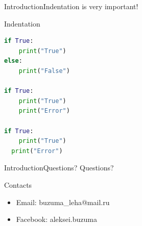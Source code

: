 \documentclass[10pt]{beamer}
\begin{document}
\begin{frame}[fragile]{Introduction}{Indentation is very important!}
	
\begin{block}{Indentation}
	
\begin{lstlisting}[language=Python, tabsize=4, showspaces=true, showtabs=true]
if True:
    print("True")
else:
    print("False")

if True:
	print("True")
    print("Error")

if True:
    print("True")
  print("Error")
\end{lstlisting}

\end{block}	
	
\end{frame}


\begin{frame}{Introduction}{Questions?}
	\large Questions?
	\begin{center}
		
		\begin{block}{Contacts}
			\begin{itemize}
				\item Email:    buzuma\_leha@mail.ru
				\item Facebook: aleksei.buzuma
			\end{itemize}
		\end{block}
		
	\end{center}
\end{frame}
\end{document}
